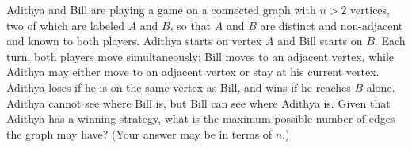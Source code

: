 Adithya and Bill are playing a game on a connected graph with $n > 2$ vertices, two of which are labeled $A$ and $B$, so that $A$ and $B$ are distinct and non-adjacent and known to both players. Adithya starts on vertex $A$ and Bill starts on $B$. Each turn, both players move simultaneously: Bill moves to an adjacent vertex, while Adithya may either move to an adjacent vertex or stay at his current vertex. Adithya loses if he is on the same vertex as Bill, and wins if he reaches $B$ alone. Adithya cannot see where Bill is, but Bill can see where Adithya is. Given that Adithya has a winning strategy, what is the maximum possible number of edges the graph may have? (Your answer may be in terms of $n$.)

